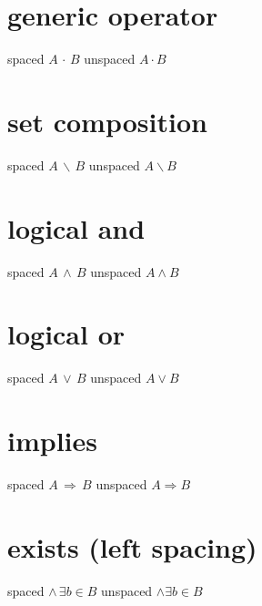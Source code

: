 \documentclass{article}
\newcommand{\spaced}[1]{\, #1 \,}
\newcommand{\scomp}{\spaced{\backslash}}
\newcommand{\sland}{\spaced{\land}}
\newcommand{\slor}{\spaced{\lor}}
\newcommand{\simplies}{\spaced{\Rightarrow}}
\newcommand{\slexists}{\, \exists}
\begin{document}
\begin{center}

\section*{generic operator}
spaced $A \spaced{\cdot} B$ \qquad unspaced $A \cdot B$

\section*{set composition}
spaced $A \scomp B$ \qquad unspaced $A \backslash B$

\section*{logical and}
spaced $A \sland B$ \qquad unspaced $A \land B$

\section*{logical or}
spaced $A \slor B$ \qquad unspaced $A \lor B$

\section*{implies}
spaced $A \simplies B$ \qquad unspaced $A \Rightarrow B$

\section*{exists (left spacing)}
spaced $\land \slexists b \in B$ \qquad unspaced $\land \exists b \in B$

\end{center}
\end{document}
